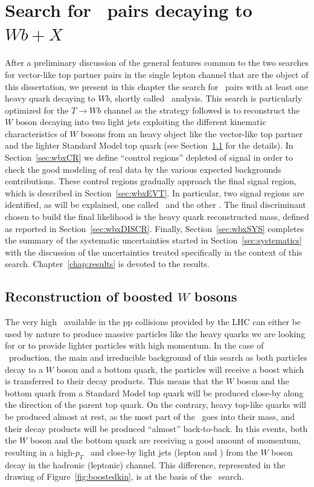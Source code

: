 \clearpage{\pagestyle{empty}\cleardoublepage}

\chapter{Search for \TTbar\ pairs decaying to $Wb+X$}\label{chap:wbx}

After a preliminary discussion of the general features
common to the two searches for vector-like top partner pairs
in the single lepton channel that are the object of this dissertation,
we present in this chapter the search for \TTbar\ pairs with
at least one heavy quark decaying to $Wb$, shortly called 
\wbx\ analysis.
This search is particularly optimized for the $T\to Wb$ channel
as the strategy followed is to reconstruct the $W$ boson decaying
into two light jets exploiting the different kinematic characteristics
of $W$ bosons from an heavy object like the vector-like top partner
and the lighter Standard Model top quark (see Section~\ref{sec:boostedW}
for the details).
In Section~\ref{sec:wbxCR} we define ``control regions'' depleted of
signal in order to check the good modeling of real data by the various expected
backgrounds contributions. These control regions gradually approach
the final signal region, which is described in Section~\ref{sec:wbxEVT}.
In particular, two signal regions are identified, as will be explained,
one called \loose\ and the other \tight.
The final discriminant chosen to build the final likelihood is
the heavy quark reconstructed mass, defined as reported in Section~\ref{sec:wbxDISCR}.
Finally, Section~\ref{sec:wbxSYS} completes the summary
of the systematic uncertainties started in Section~\ref{sec:systematics}
with the discussion of the uncertainties treated specifically
in the context of this search.
Chapter~\ref{chap:results} is devoted to the results.

\section{Reconstruction of boosted $W$ bosons}\label{sec:boostedW}

The very high \cme\ available in the pp collisions provided by the LHC
can either be used by nature to produce massive particles like the heavy 
quarks we are looking for or to provide lighter particles with high momentum.
In the case of \ttbar\ production, the main and irreducible background
of this search as both particles decay to a $W$ boson and a bottom quark,
the particles will receive a boost which is transferred to their decay
products. This means that the $W$ boson and the bottom quark from a Standard
Model top quark will be produced close-by along the direction of the parent
top quark. On the contrary, heavy top-like quarks will be produced almost
at rest, as the most part of the \cme\ goes into their mass, and their
decay products will be produced ``almost'' back-to-back. In this events,
both the $W$ boson and the bottom quark are receiving a good amount of
momentum, resulting in a high-$p_T$ \bjet\ and close-by light jets (lepton and \met)
from the $W$ boson decay in the hadronic (leptonic) channel. This
difference, represented in the drawing of Figure~\ref{fig:boostedkin},
is at the basis of the \wbx\ search.

